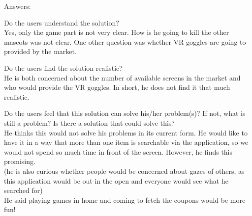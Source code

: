 \documentclass[a4paper,10pt,oneside]{scrreprt}
\begin{document}
Answers:
\begin{compactitem}
	\item Do the users understand the solution?\\
		Yes, only the game part is not very clear. How is he going to kill the other mascots was not clear. One other question was whether VR goggles are going to provided by the market.\\
	
	\item Do the users find the solution realistic?\\
	He is both concerned about the number of available screens in the market and who would provide the VR goggles. In short, he does not find it that much realistic.\\
	
	\item Do the users feel that this solution can solve his/her problem(s)? If not, what is still
	a problem? Is there a solution that could solve this?\\
		He thinks this would not solve his problems in its current form. He would like to have it in a way that more than one item is searchable via the application, so we would not spend so much time in front of the screen. However, he finds this promising.\\
		(he is also curious whether people would be concerned about gazes of others, as this application would be out in the open and everyone would see what he searched for)\\
		He said playing games in home and coming to fetch the coupons would be more fun!
\end{compactitem}

\clearpage
\end{document}

